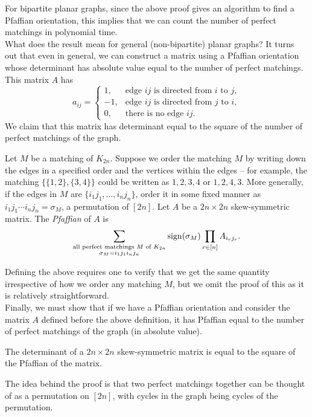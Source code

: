 For bipartite planar graphs, since the above proof gives an algorithm to find a Pfaffian orientation, this implies that we can count the number of perfect matchings in polynomial time.\\
What does the result mean for general (non-bipartite) planar graphs? It turns out that even in general, we can construct a matrix using a Pfaffian orientation whose determinant has absolute value equal to the number of perfect matchings. This matrix $A$ has
\[ a_{ij} = \begin{cases} 1, & \text{edge $ij$ is directed from $i$ to $j$,} \\ -1, & \text{edge $ij$ is directed from $j$ to $i$}, \\ 0, & \text{there is no edge $ij$.} \end{cases} \]
We claim that this matrix has determinant equal to the square of the number of perfect matchings of the graph.

\begin{fdef}[Pfaffian]
	Let $M$ be a matching of $K_{2n}$. Suppose we order the matching $M$ by writing down the edges in a specified order and the vertices within the edges -- for example, the matching $\{\{1,2\},\{3,4\}\}$ could be written as $1,2,3,4$ or $1,2,4,3$. More generally, if the edges in $M$ are $\{i_1j_1,\ldots,i_nj_n\}$, order it in some fixed manner as $i_1j_1 \cdots i_nj_n = \sigma_M$, a permutation of $[2n]$. Let $A$ be a $2n \times 2n$ skew-symmetric matrix. The \emph{Pfaffian} of $A$ is
	\[ \sum_{\substack{\text{all perfect matchings $M$ of $K_{2n}$} \\ \sigma_M = i_1j_1i_nj_n}} \operatorname{sign}(\sigma_M) \prod_{r \in [n]} A_{i_r j_r}.  \]
\end{fdef}
Defining the above requires one to verify that we get the same quantity irrespective of how we order any matching $M$, but we omit the proof of this as it is relatively straightforward.\\
Finally, we must show that if we have a Pfaffian orientation and consider the matrix $A$ defined before the above definition, it has Pfaffian equal to the number of perfect matchings of the graph (in absolute value).

\begin{fprop}
	The determinant of a $2n \times 2n$ skew-symmetric matrix is equal to the square of the Pfaffian of the matrix.
\end{fprop}
The idea behind the proof is that two perfect matchings together can be thought of as a permutation on $[2n]$, with cycles in the graph being cycles of the permutation.

